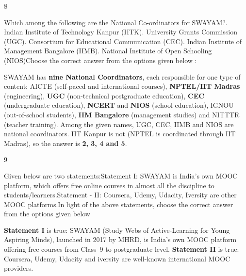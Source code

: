 \begin{question}{8}
{Which among the following are the National Co-ordinators for SWAYAM?. Indian Institute of Technology Kanpur (IITK). University Grants Commission (UGC). Consortium for Educational Communication (CEC). Indian Institute of Management Bangalore (IIMB). National Institute of Open Schooling (NIOS)\newline Choose the correct answer from the options given below :\par}
\begin{explain}
SWAYAM has \textbf{nine National Coordinators}, each responsible for one type of content: AICTE (self-paced and international courses), \textbf{NPTEL/IIT Madras} (engineering), \textbf{UGC} (non-technical postgraduate education), \textbf{CEC} (undergraduate education), \textbf{NCERT} and \textbf{NIOS} (school education), IGNOU (out-of-school students), \textbf{IIM Bangalore} (management studies) and NITTTR (teacher training).
Among the given names, UGC, CEC, IIMB and NIOS are national coordinators. IIT Kanpur is not (NPTEL is coordinated through IIT Madras), so the answer is \textbf{2, 3, 4 and 5}.
\end{explain}
\end{question}

\begin{question}{9}
{Given below are two statements:\newline Statement I: SWAYAM is India's own MOOC platform, which offers free online courses in almost all the discipline to students/learners.\newline Statement - II: Coursera, Udemy, Udacity, Iversity are other MOOC platforms.\newline In light of the above statements, choose the correct answer from the options given below\par}
\begin{explain}
\textbf{Statement I} is true: SWAYAM (Study Webs of Active-Learning for Young Aspiring Minds), launched in 2017 by MHRD, is India's own MOOC platform offering free courses from Class~9 to postgraduate level. \textbf{Statement II} is true: Coursera, Udemy, Udacity and iversity are well-known international MOOC providers.
\end{explain}
\end{question}

